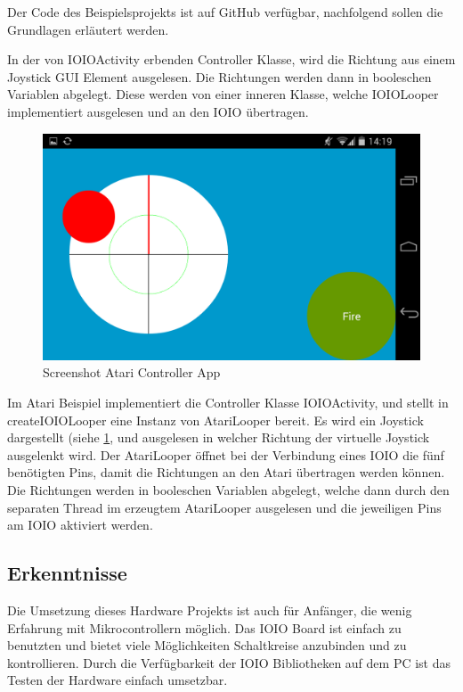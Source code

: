 \documentclass[12pt,journal,compsoc]{IEEEtran}
\begin{document}
Der Code des Beispielsprojekts ist auf GitHub verfügbar, nachfolgend sollen die Grundlagen erläutert werden. \cite{danners_github}

In der von IOIOActivity erbenden Controller Klasse, wird die Richtung aus einem Joystick GUI Element ausgelesen. Die Richtungen werden dann in booleschen Variablen abgelegt.
Diese werden von einer inneren Klasse, welche IOIOLooper implementiert ausgelesen und an den IOIO übertragen.

\begin{figure}
	\centering
\includegraphics[width=\linewidth,angle=0]{media/screenshot.png}
\caption{Screenshot Atari Controller App}
\label{fig:atari_c}
\end{figure}

Im Atari Beispiel implementiert die Controller Klasse IOIOActivity, und stellt in createIOIOLooper eine Instanz von AtariLooper bereit. 
Es wird ein Joystick dargestellt (siehe \ref{fig:atari_c}, und ausgelesen in welcher Richtung der virtuelle Joystick ausgelenkt wird. 
Der AtariLooper öffnet bei der Verbindung eines IOIO die fünf benötigten Pins, damit die Richtungen an den Atari übertragen werden können.
Die Richtungen werden in booleschen Variablen abgelegt, welche dann durch den separaten Thread im erzeugtem AtariLooper ausgelesen und die jeweiligen Pins am IOIO aktiviert werden. 

\subsection{Erkenntnisse}

Die Umsetzung dieses Hardware Projekts ist auch für Anfänger, die wenig Erfahrung mit Mikrocontrollern möglich.
Das IOIO Board ist einfach zu benutzten und bietet viele Möglichkeiten Schaltkreise anzubinden und zu kontrollieren.
Durch die Verfügbarkeit der IOIO Bibliotheken auf dem PC ist das Testen der Hardware einfach umsetzbar.
\end{document}
